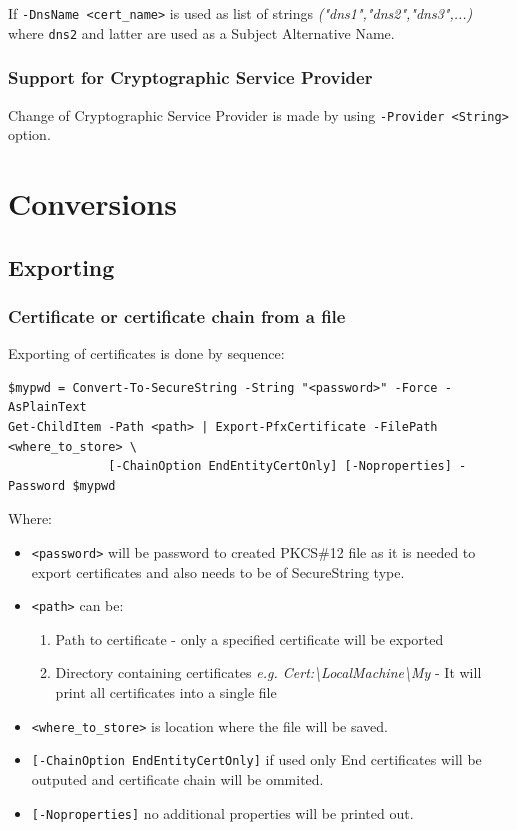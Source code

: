\documentclass[10pt, a4paper]{report}
\begin{document}
If \verb+-DnsName <cert_name>+ is used as list of strings \textit{("dns1","dns2","dns3",...)} where \verb+dns2+ and latter are used as a Subject Alternative Name.    

    \subsubsection{Support for Cryptographic Service Provider}
Change of Cryptographic Service Provider is made by using \verb+-Provider <String>+ option.

\section{Conversions}

  \subsection{Exporting}
  
    \subsubsection{Certificate or certificate chain from a file}
Exporting of certificates is done by sequence:
\begin{verbatim}
$mypwd = Convert-To-SecureString -String "<password>" -Force -AsPlainText
Get-ChildItem -Path <path> | Export-PfxCertificate -FilePath <where_to_store> \
              [-ChainOption EndEntityCertOnly] [-Noproperties] -Password $mypwd
\end{verbatim}

Where:
\begin{itemize}
\item \verb+<password>+ will be password to created PKCS\#12 file as it is needed to export certificates and also needs to be of SecureString type.
\item \verb+<path>+ can be:
\begin{enumerate}
\item Path to certificate - only a specified certificate will be exported
\item Directory containing certificates \textit{e.g. Cert:{\textbackslash}LocalMachine{\textbackslash}My} - It will print all certificates into a single file
\end{enumerate}
\item \verb+<where_to_store>+ is location where the file will be saved.
\item \verb+[-ChainOption EndEntityCertOnly]+ if used only End certificates will be outputed and certificate chain will be ommited.
\item \verb+[-Noproperties]+ no additional properties will be printed out.
\end{itemize}
\end{document}
